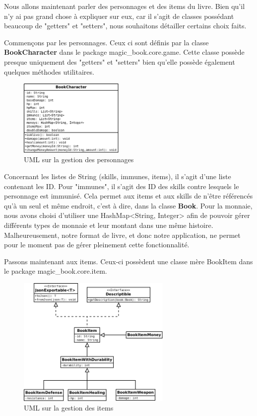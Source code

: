 			Nous allons maintenant parler des personnages et des items du livre. Bien qu'il n'y ai pas grand chose à expliquer sur eux, car il s'agit de classes possédant beaucoup de "getters" et "setters", nous souhaitons détailler certains choix faits.

			Commençons par les personnages. Ceux ci sont définis par la classe \textbf{BookCharacter} dans le package magic\_book.core.game. Cette classe possède presque uniquement des "getters" et "setters" bien qu'elle possède également quelques méthodes utilitaires.

			\begin{figure}[H]
				\centering\includegraphics[width=0.45\textwidth, keepaspectratio]{img/book_character.png}
				\caption{UML sur la gestion des personnages}
			\end{figure}

			Concernant les listes de String (skills, immunes, items), il s'agit d'une liste contenant les ID. Pour "immunes", il s'agit des ID des skills contre lesquels le personnage est immunisé. Cela permet aux items et aux skills de n'être référencés qu'à un seul et même endroit, c'est à dire, dans la classe \textbf{Book}. Pour la monnaie, nous avons choisi d'utiliser une HashMap<String, Integer> afin de pouvoir gérer différents types de monnaie et leur montant dans une même histoire. Malheureusement, notre format de livre, et donc notre application, ne permet pour le moment pas de gérer pleinement cette fonctionnalité.

			Passons maintenant aux items. Ceux-ci possèdent une classe mère BookItem dans le package magic\_book.core.item.

			\begin{figure}[H]
				\centering\includegraphics[width=0.66\textwidth, keepaspectratio]{img/book_item.png}
				\caption{UML sur la gestion des items}
			\end{figure}

